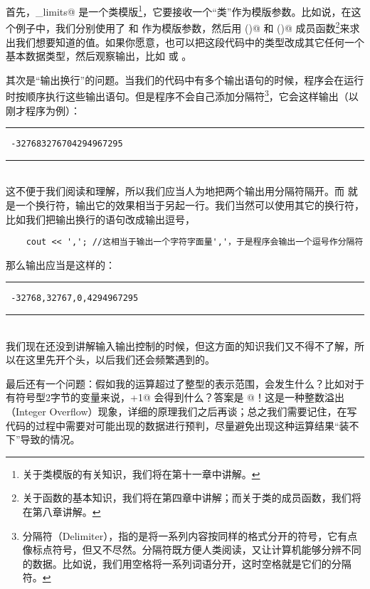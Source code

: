 首先，\lstinline@numeric_limits@ 是一个类模版\footnote{关于类模版的有关知识，我们将在第十一章中讲解。}，它要接收一个``类''作为模版参数。比如说，在这个例子中，我们分别使用了 \lstinline@short@ 和 \lstinline@unsigned@ 作为模版参数，然后用 \lstinline@lowest()@ 和 \lstinline@max()@ 成员函数\footnote{关于函数的基本知识，我们将在第四章中讲解；而关于类的成员函数，我们将在第八章讲解。}来求出我们想要知道的值。如果你愿意，也可以把这段代码中的类型改成其它任何一个基本数据类型，然后观察输出，比如 \lstinline@double@ 或 \lstinline@char@。\par
其次是``输出换行''的问题。当我们的代码中有多个输出语句的时候，程序会在运行时按顺序执行这些输出语句。但是程序不会自己添加分隔符\footnote{分隔符（Delimiter），指的是将一系列内容按同样的格式分开的符号，它有点像标点符号，但又不尽然。分隔符既方便人类阅读，又让计算机能够分辨不同的数据。比如说，我们用空格将一系列词语分开，这时空格就是它们的分隔符。}，它会这样输出（以刚才程序为例）：\\\noindent\rule{\textwidth}{.2pt}\texttt{
-327683276704294967295
}\\\noindent\rule{\textwidth}{.2pt}\\
这不便于我们阅读和理解，所以我们应当人为地把两个输出用分隔符隔开。而 \lstinline@cout@ 就是一个换行符，输出它的效果相当于另起一行。我们当然可以使用其它的换行符，比如我们把输出换行的语句改成输出逗号，
\begin{lstlisting}
    cout << ','; //这相当于输出一个字符字面量','，于是程序会输出一个逗号作分隔符
\end{lstlisting}
那么输出应当是这样的：\\\noindent\rule{\textwidth}{.2pt}\texttt{
-32768,32767,0,4294967295
}\\\noindent\rule{\textwidth}{.2pt}\\
我们现在还没到讲解输入输出控制的时候，但这方面的知识我们又不得不了解，所以在这里先开个头，以后我们还会频繁遇到的。\par
最后还有一个问题：假如我的运算超过了整型的表示范围，会发生什么？比如对于有符号型2字节的变量来说，+1@ 会得到什么？答案是 @！这是一种整数溢出（Integer Overflow）现象，详细的原理我们之后再谈；总之我们需要记住，在写代码的过程中需要对可能出现的数据进行预判，尽量避免出现这种运算结果``装不下''导致的情况。\par

